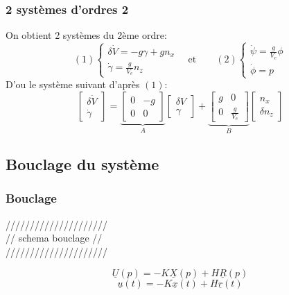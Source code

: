 \documentclass[footheight=2em]{beamer}
\begin{document}
\begin{frame}
    \frametitle{2 systèmes d'ordres 2} \pause{}
    On obtient 2 systèmes du 2ème ordre:
    \[
    (1)
    \left \{
    \begin{array}{c}
        \delta \dot{V} = -g \gamma + g n_x \\
        \dot{\gamma} = \frac{g}{V_e}n_z
    \end{array}
    \right.
    \quad \text{et} \qquad
    (2)
    \left \{
    \begin{array}{c}
        \dot{\psi} = \frac{g}{V_e} \phi \\
        \dot{\phi} = p
    \end{array}
    \right.
    \] \pause{}
    D'ou le système suivant d'après \( (1) \):
    \[
    \left[
    \begin{array}{c}
        \delta \dot{V}\\
        \dot{\gamma}
    \end{array}
    \right]
    =
    \underbrace{
        \left[
        \begin{array}{cc}
            0 & -g \\
            0 & 0
        \end{array}
        \right]
    }_{A}
    \left[
    \begin{array}{c}
        \delta V\\
        \gamma
    \end{array}
    \right]
    +
    \underbrace{
        \left[
        \begin{array}{cc}
            g & 0 \\
            0 & \frac{g}{V_e}
        \end{array}
        \right]
    }_{B}
    \left[
    \begin{array}{c}
        n_x \\
        \delta n_z
    \end{array}
    \right]
    \]
\end{frame}

\subsection{Bouclage du système}

\begin{frame}
    \frametitle{Bouclage} \pause{}
    \begin{center}
        /////////////////////\\
        // schema bouclage //\\
        /////////////////////
    \end{center}
    \[
    \underline{U}(p) = -K \underline{X}(p) + H \underline{R}(p)
    \]
    \[
    \underline{u}(t) = -K \underline{x}(t) + H \underline{r}(t)
    \]

\end{frame}
\end{document}
